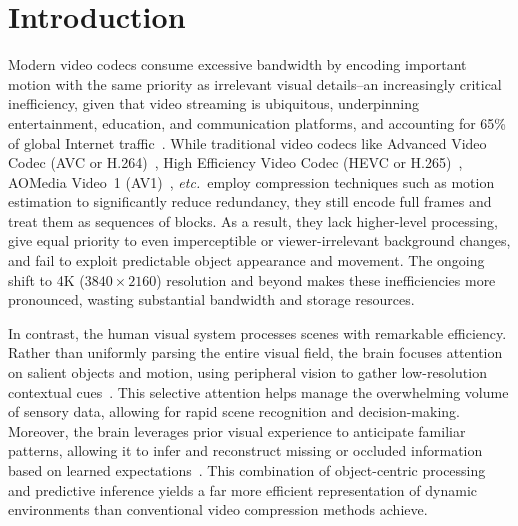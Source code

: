 \documentclass[manuscript, screen]{acmart}
\newcommand{\etc}{\emph{etc.\xspace}}
\newcommand{\vxv}[2]{$#1\!\times\!#2$}
\begin{document}
\section{Introduction}
Modern video codecs consume excessive bandwidth by encoding important motion with the same priority as irrelevant visual details--an increasingly critical inefficiency, given that video streaming is ubiquitous, underpinning entertainment, education, and communication platforms, and accounting for 65\% of global Internet traffic~\cite{sandvine}. While traditional video codecs like Advanced Video Codec (AVC or H.264)~\cite{h264_overview}, High Efficiency Video Codec (HEVC or H.265)~\cite{h265_overview}, AOMedia Video~1 (AV1)~\cite{av1_overview}, \etc ~employ compression techniques such as motion estimation to significantly reduce redundancy, they still encode full frames and treat them as sequences of blocks. As a result, they lack higher-level processing, give equal priority to even imperceptible or viewer-irrelevant background changes, and fail to exploit predictable object appearance and movement. The ongoing shift to 4K (\vxv{3840}{2160}) resolution and beyond makes these inefficiencies more pronounced, wasting substantial bandwidth and storage resources.

In contrast, the human visual system processes scenes with remarkable efficiency. Rather than uniformly parsing the entire visual field, the brain focuses attention on salient objects and motion, using peripheral vision to gather low-resolution contextual cues~\cite{cajar2016spatial}. This selective attention helps manage the overwhelming volume of sensory data, allowing for rapid scene recognition and decision-making. Moreover, the brain leverages prior visual experience to anticipate familiar patterns, allowing it to infer and reconstruct missing or occluded information based on learned expectations~\cite{serences2006selective}. This combination of object-centric processing and predictive inference yields a far more efficient representation of dynamic environments than conventional video compression methods achieve.
\end{document}

